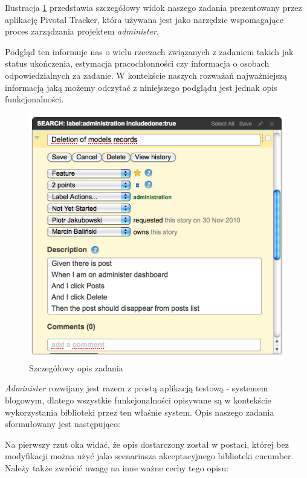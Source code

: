     Ilustracja \ref{administer_story_desc} przedstawia szczegółowy widok naszego zadania prezentowany przez aplikację Pivotal Tracker, która używana jest jako narzędzie wspomagające proces zarządzania projektem \emph{administer}.
    
    Podgląd ten informuje nas o wielu rzeczach związanych z zadaniem takich jak status ukończenia, estymacja pracochłonności czy informacja o osobach odpowiedzialnych za zadanie. W kontekście naszych rozważań najważniejszą informacją jaką możemy odczytać z niniejszego podglądu jest jednak opis funkcjonalności. 
    
    \vspace{5 mm}
    \begin{figure}[h]
  		\begin{center}
  			\includegraphics[width=0.8\linewidth]{images/administer_story_desc.png}
  			\caption{Szczegółowy opis zadania}
  			\label{administer_story_desc}
  		\end{center}
  	\end{figure}
    
    \emph{Administer} rozwijany jest razem z prostą aplikacją testową - systemem blogowym, dlatego wszystkie funkcjonalności opisywane są w kontekście wykorzystania biblioteki przez ten właśnie system. Opis naszego zadania sformułowany jest następująco:
    
    
    
    Na pierwszy rzut oka widać, że opis dostarczony został w postaci, której bez modyfikacji można użyć jako scenariusza akceptacyjnego biblioteki cucumber. Należy także zwrócić uwagę na inne ważne cechy tego opisu:
    

